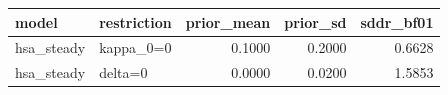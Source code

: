 \begin{tabular}{llrrr}
\toprule
model & restriction & prior\_mean & prior\_sd & sddr\_bf01 \\
\midrule
hsa\_steady & kappa\_0=0 & 0.1000 & 0.2000 & 0.6628 \\
hsa\_steady & delta=0 & 0.0000 & 0.0200 & 1.5853 \\
\bottomrule
\end{tabular}
